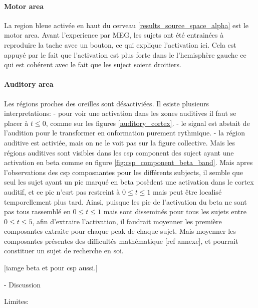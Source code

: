 \paragraph{Motor area}

La region bleue activée en haut du cerveau \ref{results_source_space_alpha} est le motor area. Avant l'experience par MEG, les sujets ont été entrainées à reproduire la tache avec un bouton, ce qui explique l'activation ici. Cela est appuyé par le fait que l'activation est plus forte dans le l'hemisphère gauche ce qui est cohérent avec le fait que les suject soient droitiers.

\paragraph{Auditory area}

Les régions proches des oreilles sont désactiviées. Il esiste plusieurs interpretations:
- pour voir une activation dans les zones auditives il faut se placer à $t \leq 0$, comme sur les figures \ref{auditory_cortex}.
- le signal est abstait de l'audition pour le transformer en onformation purement rythmique.
- la région auditive est activiée, mais on ne le voit pas sur la figure collective. Mais les régions auditives sont visibles dans les csp component des suject ayant une activation en beta comme en figure \ref{fig:csp_component_beta_band}. Mais apres l'observations des csp composnantes pour les différents subjects, il semble que seul les sujet ayant un pic marqué en beta posèdent une activation dans le cortex auditif, et ce pic n'esrt pas restreint à $0 \leq t \leq 1$ mais peut être localisé temporellement plus tard. Ainsi, puisque les pic de l'activation du beta ne sont pas tous rassemblé en $0 \leq t \leq 1$ mais sont disseminés pour tous les sujets entre $0 \leq t \leq 5$, afin d'extraire l'activation, il faudrait moyenner les première composantes extraite pour chaque peak de chaque sujet. Mais moyenner les composantes présentes des difficultés mathématique [ref annexe], et pourrait constituer un sujet de recherche en soi.


[iamge beta et pour csp aussi.]

- Discussion

Limites:

